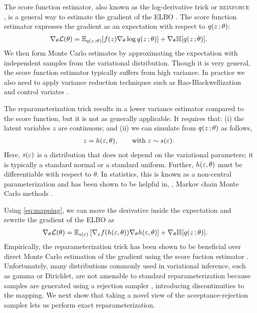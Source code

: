 The score function estimator, also known as the log-derivative trick or \textsc{reinforce} \citep{Williams1992,Glynn1990}, is a general way to estimate the gradient of the \gls{ELBO} \citep{Paisley2012,Ranganath2014,Mnih2014}. The score function estimator expresses the gradient as an expectation with respect to $q(z\, ;\theta)$:
\begin{align*}
\nabla_\theta \mathcal{L}(\theta) = \mathbb{E}_{q(z\, ;\theta)}[ f(z) \nabla_\theta \log q(z\, ;\theta)] + \nabla_\theta \mathbb{H}[q(z\, ; \theta)].
\end{align*}
We then form Monte Carlo estimates by approximating the expectation with independent samples from the variational distribution. Though it is very general, the score function estimator typically suffers from high variance. In practice we also need to apply variance reduction techniques such as Rao-Blackwellization \citep{Casella1996} and control variates \citep{robert2004monte}.

The reparameterization trick \citep{Salimans2013,Kingma2014,Price1958,Bonnet1964} results in a lower variance estimator compared to the score function, but it is not as generally applicable. It requires that: (i) the latent variables $z$ are continuous; and (ii) we can simulate from $q(z\, ;\theta)$ as follows, %
\begin{align}
z = h(\varepsilon,\theta),\qquad \textrm{with } \varepsilon \sim s(\varepsilon).
\label{eq:mapping}
\end{align}
Here, $s(\varepsilon)$ is a distribution that does not depend on the variational parameters; it is typically a standard normal or a standard uniform. Further, $h(\varepsilon,\theta)$ must be differentiable with respect to $\theta$. In statistics, this is known as a non-central parameterization and has been shown to be helpful in, \eg, Markov chain Monte Carlo methods \citep{bernardo2003non}.

Using \eqref{eq:mapping}, we can move the derivative inside the expectation and rewrite the gradient of the \gls{ELBO} as
\begin{align*}
&\nabla_\theta \mathcal{L}(\theta) = \mathbb{E}_{ s(\varepsilon) }\left[\nabla_z f(h(\varepsilon,\theta)) \nabla_\theta h(\varepsilon,\theta)\right] + \nabla_\theta \mathbb{H}[q(z\, ; \theta)].
\end{align*}
Empirically, the reparameterization trick has been shown to be beneficial over direct Monte Carlo estimation of the gradient using the score fuction estimator \citep{Salimans2013,Kingma2014,Titsias2014_doubly,Fan2015}. Unfortunately, many distributions commonly used in variational inference, such as gamma or Dirichlet, are not amenable to standard reparameterization because samples are generated using a rejection sampler \citep{vonneumann:51,robert2004monte}, introducing discontinuities to the mapping. We next show that taking a novel view of the acceptance-rejection sampler lets us perform exact reparameterization.


